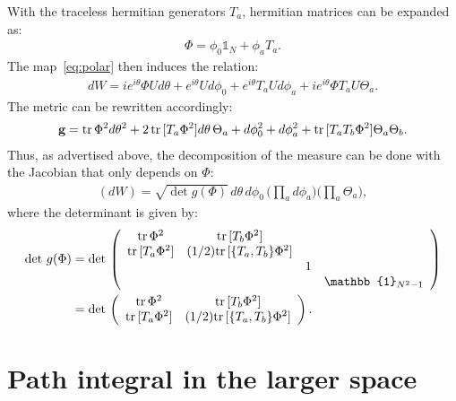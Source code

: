 \documentclass[12pt]{article}
\begin{document}
With the traceless hermitian generators $T_a$,
hermitian matrices can be expanded as:
\begin{align}
  \Phi = \phi_0 \mathbb{1}_N + \phi_a T_a.
\end{align}
The map~\eqref{eq:polar} then induces the relation:
\begin{align}
  dW
  =
  i e^{i\theta} \Phi U d\theta
  +
  e^{i\theta} U d\phi_0
  +
  e^{i\theta} T_a U d\phi_a
  +
  i e^{i\theta} \Phi T_a U \Theta_a.
  \label{eq:expand_dw}
\end{align}
The metric can be rewritten accordingly:
\begin{align}
  \textbf{g}
  =
  {\rm tr}\, \Phi^2  d\theta^2
  +
  2 \, {\rm tr}\,[T_a \Phi^2] d\theta \, \Theta_a
  +
  d\phi_0^2
  +
  d\phi_a^2
  +
  {\rm tr}\, [T_a T_b \Phi^2]  \Theta_a \Theta_b.
\end{align}
Thus, as advertised above,
the decomposition of the measure can be done with the
Jacobian that only depends on $\Phi$:
\begin{align}
  (dW)
  =
  \sqrt{\det g(\Phi)}
  \,
  d\theta
  \,
  d\phi_0
  \,
  \Big(\prod_a d\phi_a\Big)
  \Big(\prod_a \Theta_a \Big),
  \label{eq:measure_w}
\end{align}
where the determinant is
given by:
\begin{align}
  \det\,g(\Phi)
  & =
    \det\,\left(
    \begin{array}{c c c c}
      {\rm tr}\, \Phi^2 & {\rm tr}\,[T_b \Phi^2] & & \\
      {\rm tr}\,[T_a \Phi^2] & (1/2){\rm tr}\,[\{T_a, T_b\} \Phi^2] & & \\
                        && 1 & \\
                        && & \mathbb{1}_{N^2-1}
    \end{array}
    \right) \\
  & =
    \det\,\left(
    \begin{array}{c c}
      {\rm tr}\, \Phi^2 & {\rm tr}\,[T_b \Phi^2] \\
      {\rm tr}\,[T_a \Phi^2] & (1/2){\rm tr}\,[\{T_a, T_b\} \Phi^2]
    \end{array}
    \right).
\end{align}


\section{Path integral in the larger space}
\label{sec:path_integral}
\end{document}
